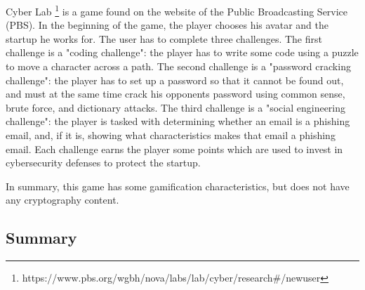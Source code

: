 \documentclass{l4proj}
\begin{document}
Cyber Lab \footnote{https://www.pbs.org/wgbh/nova/labs/lab/cyber/research\#/newuser} is a game found on the website of the Public Broadcasting Service (PBS). 
In the beginning of the game, the player chooses his avatar and the startup he works for.
The user has to complete three challenges. 
The first challenge is a "coding challenge": the player has to write some code using a puzzle to move a character across a path.
The second challenge is a "password cracking challenge": the player has to set up a password so that it cannot be found out, 
and must at the same time crack his opponents password using common sense, brute force, and dictionary attacks.
The third challenge is a "social engineering challenge": the player is tasked with determining whether an email is a phishing email, 
and, if it is, showing what characteristics makes that email a phishing email.
Each challenge earns the player some points which are used to invest in cybersecurity defenses to protect the startup.

In summary, this game has some gamification characteristics, but does not have any cryptography content.

\subsection{Summary}
\end{document}
